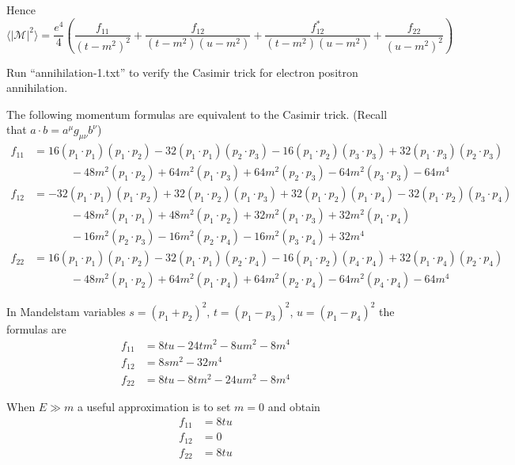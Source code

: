 \documentclass[12pt]{article}
\begin{document}
\noindent
Hence
\begin{equation*}
\langle|\mathcal{M}|^2\rangle
=
\frac{e^4}{4}
\left(
\frac{f_{11}}{(t-m^2)^2}
+\frac{f_{12}}{(t-m^2)(u-m^2)}
+\frac{f_{12}^*}{(t-m^2)(u-m^2)}
+\frac{f_{22}}{(u-m^2)^2}
\right)
\end{equation*}

\noindent
Run ``annihilation-1.txt'' to verify the Casimir trick for electron positron annihilation.

\bigskip
\noindent
The following momentum formulas are equivalent to the Casimir trick.
(Recall that $a\cdot b=a^\mu g_{\mu\nu}b^\nu$)
\begin{align*}
f_{11}&=
16 (p_1 \cdot p_1) (p_1 \cdot p_2) -
32 (p_1 \cdot p_1) (p_2 \cdot p_3) -
16 (p_1 \cdot p_2) (p_3 \cdot p_3) +
32 (p_1 \cdot p_3) (p_2 \cdot p_3) %
\\&\phantom{=}\qquad{}-
48 m^2 (p_1 \cdot p_2) +
64 m^2 (p_1 \cdot p_3) +
64 m^2 (p_2 \cdot p_3) -
64 m^2 (p_3 \cdot p_3) - 64 m^4
\\
f_{12}&=
-32 (p_1 \cdot p_1) (p_1 \cdot p_2) +
 32 (p_1 \cdot p_2) (p_1 \cdot p_3) +
 32 (p_1 \cdot p_2) (p_1 \cdot p_4) -
 32 (p_1 \cdot p_2) (p_3 \cdot p_4) %
\\&\phantom{=}\qquad{}-
 48 m^2 (p_1 \cdot p_1) +
 48 m^2 (p_1 \cdot p_2) +
 32 m^2 (p_1 \cdot p_3) +
 32 m^2 (p_1 \cdot p_4) %
\\&\phantom{=}\qquad{}-
 16 m^2 (p_2 \cdot p_3) -
 16 m^2 (p_2 \cdot p_4) -
 16 m^2 (p_3 \cdot p_4) + 32 m^4
\\
f_{22}&=
16 (p_1 \cdot p_1) (p_1 \cdot p_2) -
32 (p_1 \cdot p_1) (p_2 \cdot p_4) -
16 (p_1 \cdot p_2) (p_4 \cdot p_4) +
32 (p_1 \cdot p_4) (p_2 \cdot p_4) %
\\&\phantom{=}\qquad{}-
48 m^2 (p_1 \cdot p_2) +
64 m^2 (p_1 \cdot p_4) +
64 m^2 (p_2 \cdot p_4) -
64 m^2 (p_4 \cdot p_4) - 64 m^4
\end{align*}

\noindent
In Mandelstam variables $s=(p_1+p_2)^2$, $t=(p_1-p_3)^2$, $u=(p_1-p_4)^2$ the formulas are
\begin{align*}
f_{11}&=8 t u - 24 t m^2 - 8 u m^2 - 8 m^4
\\
f_{12}&=8 s m^2 - 32 m^4
\\
f_{22}&=8 t u - 8 t m^2 - 24 u m^2 - 8 m^4
\end{align*}

\noindent
When $E\gg m$ a useful approximation is to set $m=0$ and obtain
\begin{align*}
f_{11}&=8tu
\\
f_{12}&=0
\\
f_{22}&=8tu
\end{align*}
\end{document}
